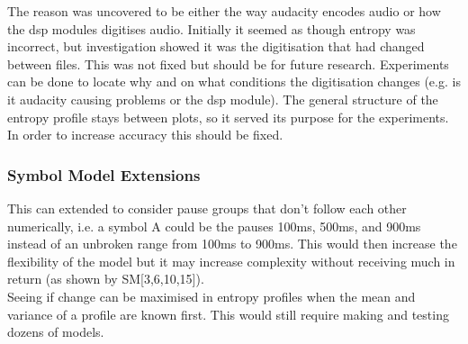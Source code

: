 The reason was uncovered to be either the way audacity encodes audio or how the dsp modules digitises audio. Initially it seemed as though entropy was incorrect, but investigation showed it was the digitisation that had changed between files. This was not fixed but should be for future research. Experiments can be done to locate why and on what conditions the digitisation changes (e.g. is it audacity causing problems or the dsp module). The general structure of the entropy profile stays between plots, so it served its purpose for the experiments. In order to increase accuracy this should be fixed. 




\subsubsection{Symbol Model Extensions}
This can extended to consider pause groups that don't follow each other numerically, i.e. a symbol A could be the pauses 100ms, 500ms, and 900ms instead of an unbroken range from 100ms to 900ms. This would then increase the flexibility of the model but it may increase complexity without receiving much in return (as shown by SM[3,6,10,15]). \\
Seeing if change can be maximised in entropy profiles when the mean and variance of a profile are known first. This would still require making and testing dozens of models.


%
%


